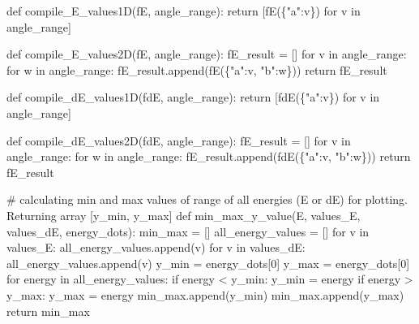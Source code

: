 \documentclass[
  letterpaper,
  DIV=11,
  numbers=noendperiod]{scrartcl}
\newenvironment{Shaded}{\begin{snugshade}}{\end{snugshade}}
\newcommand{\CommentTok}[1]{\textcolor[rgb]{0.37,0.37,0.37}{#1}}
\newcommand{\ControlFlowTok}[1]{\textcolor[rgb]{0.00,0.23,0.31}{#1}}
\newcommand{\DecValTok}[1]{\textcolor[rgb]{0.68,0.00,0.00}{#1}}
\newcommand{\KeywordTok}[1]{\textcolor[rgb]{0.00,0.23,0.31}{#1}}
\newcommand{\NormalTok}[1]{\textcolor[rgb]{0.00,0.23,0.31}{#1}}
\newcommand{\OperatorTok}[1]{\textcolor[rgb]{0.37,0.37,0.37}{#1}}
\newcommand{\StringTok}[1]{\textcolor[rgb]{0.13,0.47,0.30}{#1}}
\begin{document}
\begin{Shaded}
\begin{Highlighting}[]
    \KeywordTok{def}\NormalTok{ compile\_E\_values1D(fE, angle\_range):}
        \ControlFlowTok{return}\NormalTok{ [fE(\{}\StringTok{"a"}\NormalTok{:v\}) }\ControlFlowTok{for}\NormalTok{ v }\KeywordTok{in}\NormalTok{ angle\_range]}
    
    \KeywordTok{def}\NormalTok{ compile\_E\_values2D(fE, angle\_range):}
\NormalTok{        fE\_result }\OperatorTok{=}\NormalTok{ []}
        \ControlFlowTok{for}\NormalTok{ v }\KeywordTok{in}\NormalTok{ angle\_range:}
            \ControlFlowTok{for}\NormalTok{ w }\KeywordTok{in}\NormalTok{ angle\_range:}
\NormalTok{                fE\_result.append(fE(\{}\StringTok{"a"}\NormalTok{:v, }\StringTok{"b"}\NormalTok{:w\}))}
                \ControlFlowTok{return}\NormalTok{ fE\_result}

    \KeywordTok{def}\NormalTok{ compile\_dE\_values1D(fdE, angle\_range):}
        \ControlFlowTok{return}\NormalTok{ [fdE(\{}\StringTok{"a"}\NormalTok{:v\}) }\ControlFlowTok{for}\NormalTok{ v }\KeywordTok{in}\NormalTok{ angle\_range]}
    
    \KeywordTok{def}\NormalTok{ compile\_dE\_values2D(fdE, angle\_range):}
\NormalTok{        fE\_result }\OperatorTok{=}\NormalTok{ []}
        \ControlFlowTok{for}\NormalTok{ v }\KeywordTok{in}\NormalTok{ angle\_range:}
            \ControlFlowTok{for}\NormalTok{ w }\KeywordTok{in}\NormalTok{ angle\_range:}
\NormalTok{                fE\_result.append(fdE(\{}\StringTok{"a"}\NormalTok{:v, }\StringTok{"b"}\NormalTok{:w\}))}
                \ControlFlowTok{return}\NormalTok{ fE\_result}
    
    \CommentTok{\# calculating min and max values of range of all energies (E or dE) for plotting. Returning array [y\_min, y\_max]}
    \KeywordTok{def}\NormalTok{ min\_max\_y\_value(E, values\_E, values\_dE, energy\_dots):}
\NormalTok{        min\_max }\OperatorTok{=}\NormalTok{ []}
\NormalTok{        all\_energy\_values }\OperatorTok{=}\NormalTok{ []}
        \ControlFlowTok{for}\NormalTok{ v }\KeywordTok{in}\NormalTok{ values\_E:}
\NormalTok{            all\_energy\_values.append(v)}
        \ControlFlowTok{for}\NormalTok{ v }\KeywordTok{in}\NormalTok{ values\_dE:}
\NormalTok{            all\_energy\_values.append(v)}
\NormalTok{        y\_min }\OperatorTok{=}\NormalTok{ energy\_dots[}\DecValTok{0}\NormalTok{]}
\NormalTok{        y\_max }\OperatorTok{=}\NormalTok{ energy\_dots[}\DecValTok{0}\NormalTok{]}
        \ControlFlowTok{for}\NormalTok{ energy }\KeywordTok{in}\NormalTok{ all\_energy\_values:}
            \ControlFlowTok{if}\NormalTok{ energy }\OperatorTok{\textless{}}\NormalTok{ y\_min:}
\NormalTok{                y\_min }\OperatorTok{=}\NormalTok{ energy}
            \ControlFlowTok{if}\NormalTok{ energy }\OperatorTok{\textgreater{}}\NormalTok{ y\_max:}
\NormalTok{                y\_max }\OperatorTok{=}\NormalTok{ energy}
\NormalTok{        min\_max.append(y\_min)}
\NormalTok{        min\_max.append(y\_max)}
        \ControlFlowTok{return}\NormalTok{ min\_max}
    

\end{Highlighting}
\end{Shaded}
\end{document}

